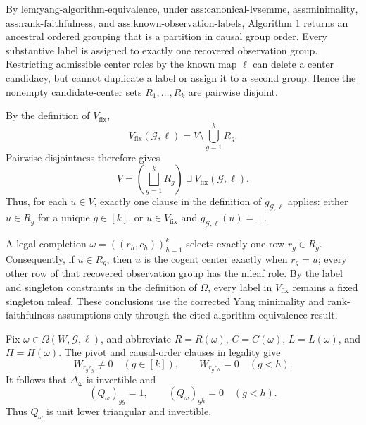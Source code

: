 By \(\text{lem:yang-algorithm-equivalence}\), under \(\text{ass:canonical-lvsemme}\), \(\text{ass:minimality}\), \(\text{ass:rank-faithfulness}\), and \(\text{ass:known-observation-labels}\), Algorithm 1 returns an ancestral ordered grouping that is a partition in causal group order. Every substantive label is assigned to exactly one recovered observation group. Restricting admissible center roles by the known map \(\ell\) can delete a center candidacy, but cannot duplicate a label or assign it to a second group. Hence the nonempty candidate-center sets \(R_1,\ldots,R_k\) are pairwise disjoint.

By the definition of \(V_{\mathrm{fix}}\),
\[
V_{\mathrm{fix}}(\mathcal G,\ell)=V\setminus\bigcup_{g=1}^{k}R_g.
\]
Pairwise disjointness therefore gives
\[
V=\left(\bigsqcup_{g=1}^{k}R_g\right)\sqcup V_{\mathrm{fix}}(\mathcal G,\ell).
\]
Thus, for each \(u\in V\), exactly one clause in the definition of \(g_{\mathcal G,\ell}\) applies: either \(u\in R_g\) for a unique \(g\in[k]\), or \(u\in V_{\mathrm{fix}}\) and \(g_{\mathcal G,\ell}(u)=\bot\).

A legal completion \(\omega=((r_h,c_h))_{h=1}^{k}\) selects exactly one row \(r_g\in R_g\). Consequently, if \(u\in R_g\), then \(u\) is the cogent center exactly when \(r_g=u\); every other row of that recovered observation group has the mleaf role. By the label and singleton constraints in the definition of \(\Omega\), every label in \(V_{\mathrm{fix}}\) remains a fixed singleton mleaf. These conclusions use the corrected Yang minimality and rank-faithfulness assumptions only through the cited algorithm-equivalence result.

Fix \(\omega\in\Omega(W,\mathcal G,\ell)\), and abbreviate \(R=R(\omega)\), \(C=C(\omega)\), \(L=L(\omega)\), and \(H=H(\omega)\). The pivot and causal-order clauses in legality give
\[
W_{r_gc_g}\ne0\quad(g\in[k]),\qquad W_{r_gc_h}=0\quad(g<h).
\]
It follows that \(\Delta_\omega\) is invertible and
\[
(Q_\omega)_{gg}=1,\qquad (Q_\omega)_{gh}=0\quad(g<h).
\]
Thus \(Q_\omega\) is unit lower triangular and invertible.

